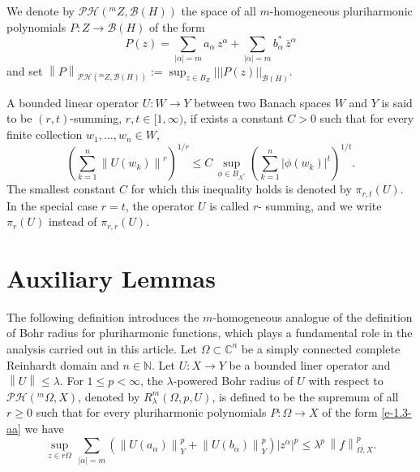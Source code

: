 \documentclass[a4paper,11pt, reqno]{amsart}
\theoremstyle{definition}
\newcommand{\norm}[1]{\left\lVert#1\right\rVert}
\begin{document}
 We denote by $\mathcal{PH}(^m Z,\mathcal{B}(H))$ the space of all $m$-homogeneous pluriharmonic polynomials $P:Z \rightarrow \mathcal{B}(H)$ of the form 
	\begin{equation} \label{e-1.3-aa}
		P(z)= \sum_{|\alpha|=m} a_{\alpha}\, z^{\alpha} +  \sum_{|\alpha|=m} b^{*}_{\alpha}\, \bar{z}^{\alpha}
	\end{equation} 
	and set $\norm{P}_{\mathcal{PH}(^m Z,\mathcal{B}(H))}:=\sup_{z \in B_{Z}}|||P(z)||_{\mathcal{B}(H)}$. 
	\par A bounded linear operator $U:W\rightarrow Y$ between two Banach spaces $W$ and $Y$ is said to be $(r,t)$-summing, $r,t \in [1,\infty)$, if exists a constant $C>0$ such that for every finite collection $w_{1}, \ldots,w_{n} \in W$,
	$$\left(\sum_{k=1}^{n} \norm{U(w_{k})}^r\right)^{1/r} \leq C \, \sup_{\phi \in B_{X^{*}}} \left(\sum_{k=1}^{n} |\phi(w_{k})|^t\right)^{1/t}.
	$$
	The smallest constant $C$ for which this inequality holds is denoted by $\pi_{r,t}(U)$. In the special case $r=t$, the operator $U$ is called $r$- summing, and we write $\pi_{r}(U)$ instead of $\pi_{r,r}(U)$.
	\section{Auxiliary Lemmas} 
	The following definition introduces the $m$-homogeneous analogue of the definition of Bohr radius for pluriharmonic functions, which plays a fundamental role in the analysis carried out in this article. Let $\Omega\subset \mathbb{C}^n$ be a simply connected complete Reinhardt domain and $n\in \mathbb{N}$. Let $U:X\rightarrow Y$ be a bounded liner operator and $\norm{U} \leq \lambda$. For $1 \leq p < \infty$, the $\lambda$-powered Bohr radius of $U$ with respect to $\mathcal{PH}(^m \Omega,X)$, denoted by $R^m_{\lambda}(\Omega, p,U)$, is defined to be the supremum of all $r\geq 0$ such that for every pluriharmonic polynomials $P:\Omega \rightarrow X$ of the form \eqref{e-1.3-aa} we have 
	\begin{equation} \label{e-1.4-aa}
		\sup_{z \in r\Omega}\, \sum_{|\alpha|=m} (\norm{U(a_{\alpha})}^p_{Y} + \norm{U(b_{\alpha})}^p_{Y})|z^\alpha|^p \leq \lambda^p\,\norm{f}^p_{\Omega,X}. 
	\end{equation}
	
\end{document}
